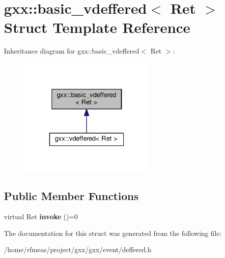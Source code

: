 \hypertarget{structgxx_1_1basic__vdeffered}{}\section{gxx\+:\+:basic\+\_\+vdeffered$<$ Ret $>$ Struct Template Reference}
\label{structgxx_1_1basic__vdeffered}


Inheritance diagram for gxx\+:\+:basic\+\_\+vdeffered$<$ Ret $>$\+:
\nopagebreak
\begin{figure}[H]
\begin{center}
\leavevmode
\includegraphics[width=193pt]{structgxx_1_1basic__vdeffered__inherit__graph}
\end{center}
\end{figure}
\subsection*{Public Member Functions}
\begin{DoxyCompactItemize}
\item 
virtual Ret {\bfseries invoke} ()=0\hypertarget{structgxx_1_1basic__vdeffered_a6424707a6c1a3886e509137b8e2d3b5b}{}\label{structgxx_1_1basic__vdeffered_a6424707a6c1a3886e509137b8e2d3b5b}

\end{DoxyCompactItemize}


The documentation for this struct was generated from the following file\+:\begin{DoxyCompactItemize}
\item 
/home/rfmeas/project/gxx/gxx/event/deffered.\+h\end{DoxyCompactItemize}
